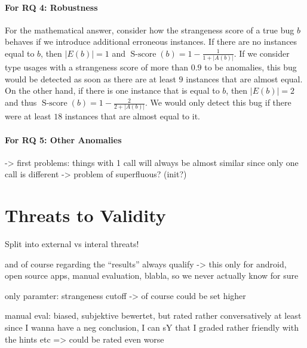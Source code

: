 \paragraph{For RQ 4: Robustness}

For the mathematical answer, consider how the strangeness score of a true bug $b$ behaves if we introduce additional erroneous instances.
If there are no instances equal to $b$, then $|E(b)|=1$ and $\operatorname{S-score}(b)=1-\frac{1}{1+|A(b)|}$.
If we consider type usages with a strangeness score of more than $0.9$ to be anomalies, this bug would be detected as soon as there are at least $9$ instances that are almost equal.
On the other hand, if there is one instance that is equal to $b$, then $|E(b)|=2$ and thus $\operatorname{S-score}(b)=1-\frac{2}{2+|A(b)|}$.
We would only detect this bug if there were at least $18$ instances that are almost equal to it.

\paragraph{For RQ 5: Other Anomalies}

    -> first problems: things with 1 call will always be almost similar since only one call is different
    -> problem of superfluous? (init?)

\section{Threats to Validity}

Split into external vs interal threats!

and of course regarding the ``results'' always qualify -> this only for android, open source apps, manual evaluation, blabla, so we never actually know for sure

only paramter: strangeness cutoff -> of course could be set higher

manual eval: biased, subjektive bewertet, but rated rather conversatively at least
since I wanna have a neg conclusion, I can sY that I graded rather friendly with the hints etc => could be rated even worse

